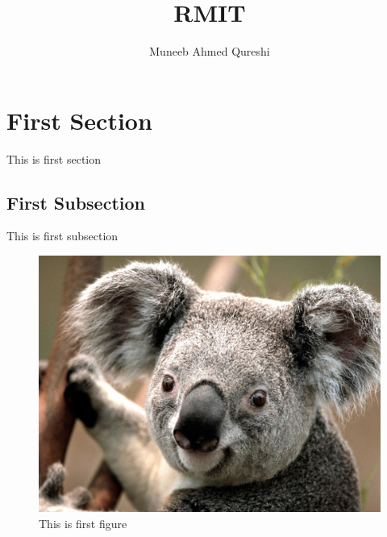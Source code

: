 \documentclass{article}
\begin{document}
\title{RMIT}
\author{Muneeb Ahmed Qureshi}
\maketitle
\section{First Section}
This is first section
\subsection{First Subsection}
This is first subsection
\begin{figure}[h]
	\includegraphics[width=\linewidth]{Koala}
	\caption{This is first figure}
\end{figure}
\end{document}
